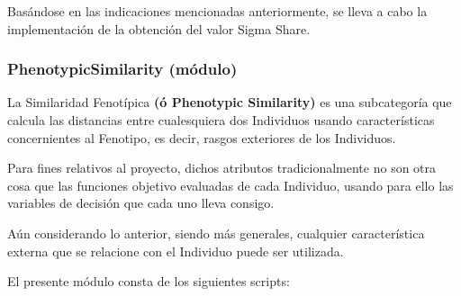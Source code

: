 \documentclass[letterpaper,10pt,english]{sphinxmanual}
\begin{document}

\begin{fulllineitems}
\label{Model/SharingFunction/GenotypicSimilarity/HammingDistance:Model.SharingFunction.GenotypicSimilarity.HammingDistance.calculate_sigma_share}
Basándose en las indicaciones mencionadas anteriormente, se
lleva a cabo la implementación de la obtención del valor Sigma Share.

\end{fulllineitems}



\subsubsection{PhenotypicSimilarity (módulo)}
\label{Model/SharingFunction/PhenotypicSimilarity/PhenotypicSimilarity::doc}\label{Model/SharingFunction/PhenotypicSimilarity/PhenotypicSimilarity:phenotypicsimilarity-modulo}
\begin{DUlineblock}{0em}
\item[] La Similaridad Fenotípica \textbf{(ó Phenotypic Similarity)} es una subcategoría
que calcula las distancias entre cualesquiera dos Individuos usando características
concernientes al Fenotipo, es decir, rasgos exteriores de los Individuos.
\item[] Para fines relativos al proyecto, dichos atributos tradicionalmente no son otra cosa que las
funciones objetivo evaluadas de cada Individuo, usando para ello las variables de decisión
que cada uno lleva consigo.
\item[] 
\item[] Aún considerando lo anterior, siendo más generales, cualquier característica externa que se relacione
con el Individuo puede ser utilizada.
\item[] 
\item[] El presente módulo consta de los siguientes scripts:
\end{DUlineblock}
\end{document}
